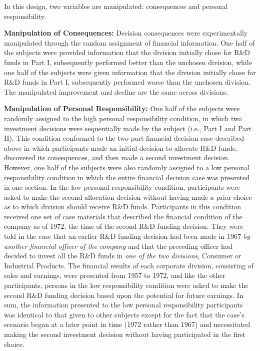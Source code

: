 \documentclass{article}
\begin{document}
In this design, two variables are manipulated: consequences and personal responsibility. 

\textbf{Manipulation of Consequences:} Decision consequences were experimentally manipulated through the random assignment of financial information. One half of the subjects were provided information that the division initially chose for R\&D funds in Part I, subsequently performed better than the unchosen division, while one half of the subjects were given information that the division initially chose for R\&D funds in Part I, subsequently performed worse than the unchosen division. The manipulated improvement and decline are the same across divisions.

\textbf{Manipulation of Personal Responsibility:} One half of the subjects were randomly assigned to the high personal responsibility condition, in which two investment decisions were sequentially made by the subject (i.e., Part I and Part II). This condition conformed to the two-part financial decision case described above in which participants made an initial decision to allocate R\&D funds, discovered its consequences, and then made a second investment decision. However, one half of the subjects were also randomly assigned to a low personal responsibility condition in which the entire financial decision case was presented in one section. In the low personal responsibility condition, participants were asked to make the second allocation decision without having made a prior choice as to which division should receive R\&D funds. Participants in this condition received one set of case materials that described the financial condition of the company as of 1972, the time of the second R\&D funding decision. They were told in the case that an earlier R\&D funding decision had been made in 1967 \textit{by another financial officer of the company} and that the preceding officer had decided to invest all the R\&D funds in \textit{one of the two divisions}, Consumer or Industrial Products. The financial results of each corporate division, consisting of sales and earnings, were presented from 1957 to 1972, and like the other participants, persons in the low responsibility condition were asked to make the second R\&D funding decision based upon the potential for future earnings. In sum, the information presented to the low personal responsibility participants was identical to that given to other subjects except for the fact that the case's scenario began at a later point in time (1972 rather than 1967) and necessitated making the second investment decision without having participated in the first choice.
\end{document}
